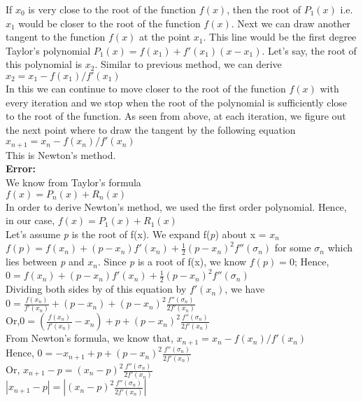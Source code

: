 \begin{enumerate}
If $x_0$ is very close to the root of the function $f(x)$, then the root of $P_1(x)$ i.e. $x_1$ would be closer to the root of the function $f(x)$. Next we can draw another tangent to the function $f(x)$ at the point $x_1$. This line would
be the first degree Taylor's polynomial $P_1(x) = f(x_1) + f'(x_1 )(x - x_1)$. Let's say, the root of this polynomial is $x_2$. Similar to previous method, we can derive \\
$x_2 = x_1 -f(x_1)/f'(x_1 )$\\
In this we can continue to move closer to the root of the function $f(x)$ with every iteration and we stop when the root
of the polynomial is sufficiently close to the root of the function. As seen from above, at each iteration, we figure out the next point where to draw the tangent by the following equation
$x_{n+1} = x_n -f(x_n)/f'(x_n )$\\
This is Newton's method.\\
{\bf Error:}\\
We know from Taylor's formula\\
$f(x) = P_n(x) + R_n(x)$\\
In order to derive Newton's method, we used the first order polynomial. Hence, in our case,
$f(x) = P_1(x) + R_1(x)$\\
Let's assume \textit{p} is the root of f(x). We expand f(\textit{p}) about x = $x_n$\\
$f(\textit{p}) = f(x_n) + (\textit{p} - {x_n})f'(x_n ) + {\frac{1}{2}}{(\textit{p} - {x_n})^2}f''({\sigma}_n)$
for some ${\sigma}_n$ which lies between \textit{p} and $x_n$. Since \textit{p} is a root of f(x), we know $f(\textit{p}) = 0$; Hence,\\
$0 = f(x_n) + (\textit{p} - {x_n})f'(x_n ) + {\frac{1}{2}}{(\textit{p} - {x_n})^2}f''({\sigma}_n)$\\
Dividing both sides by of this equation by $f'(x_n )$, we have \\
$0 = {\frac{f(x_n)}{f'(x_n )}} + (\textit{p} - {x_n}) + {(\textit{p} - {x_n})^2}{\frac{f''({\sigma}_n)}{2f'(x_n )}}$\\
Or,$0 = ({\frac{f(x_n)}{f'(x_n )}} - {x_n}) +\textit{p} + {(\textit{p} - {x_n})^2}{\frac{f''({\sigma}_n)}{2f'(x_n )}}$\\
From Newton's formula, we know that,
$x_{n+1} = x_n -f(x_n)/f'(x_n )$\\
Hence, $0 = - x_{n+1} +\textit{p} + {(\textit{p} - {x_n})^2}{\frac{f''({\sigma}_n)}{2f'(x_n )}}$\\
Or, $x_{n+1} - \textit{p} = {({x_n} - \textit{p})^2}{\frac{f''({\sigma}_n)}{2f'(x_n )}}$\\
 $\left|{x_{n+1} - \textit{p}} \right| = \left|{{({x_n} - \textit{p})^2}{\frac{f''({\sigma}_n)}{2f'(x_n )}}}\right|$\\



\end{enumerate}
